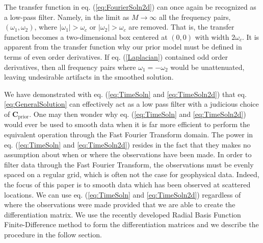 \documentclass[10pt,a4paper]{article}
\begin{document}
The transfer function in eq. (\ref{eq:FourierSoln2d}) can once again be recognized as a low-pass filter.  Namely, in the limit as $M \to \infty$ all the frequency pairs, $(\omega_1,\omega_2)$, where $|\omega_1| > \omega_c$ or $|\omega_2| > \omega_c$ are removed.  That is, the transfer function becomes a two-dimensional box centered at $(0,0)$ with width $2\omega_c$.  It is apparent from the transfer function why our prior model must be defined in terms of even order derivatives.  If eq. (\ref{Laplacian}) contained odd order derivatives, then all frequency pairs where $\omega_1=-\omega_2$ would be unattenuated, leaving undesirable artifacts in the smoothed solution.

We have demonstrated with eq. (\ref{eq:TimeSoln} and \ref{eq:TimeSoln2d}) that eq. \ref{eq:GeneralSolution} can effectively act as a low pass filter with a judicious choice of $\mathbf{C}_\mathrm{prior}$.  One may then wonder why eq. (\ref{eq:TimeSoln} and \ref{eq:TimeSoln2d}) would ever be used to smooth data when it is far more efficient to perform the equivalent operation through the Fast Fourier Transform domain.  The power in eq. (\ref{eq:TimeSoln} and \ref{eq:TimeSoln2d}) resides in the fact that they makes no assumption about when or where the observations have been made.  In order to filter data through the Fast Fourier Transform, the observations must be evenly spaced on a regular grid, which is often not the case for geophysical data.  Indeed,  the focus of this paper is to smooth data which has been observed at scattered locations.  We can use eq. (\ref{eq:TimeSoln} and \ref{eq:TimeSoln2d}) regardless of where the observations were made provided that we are able to create the differentiation matrix.  We use the recently developed Radial Basis Function Finite-Difference method to form the differentiation matrices and we describe the procedure in the follow section. 


  

 
\end{document}
